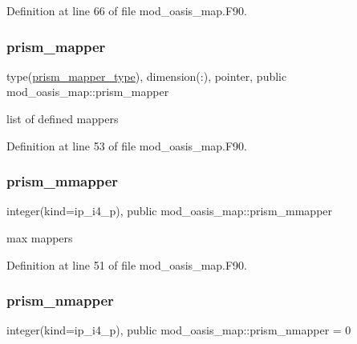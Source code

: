 Definition at line 66 of file mod\+\_\+oasis\+\_\+map.\+F90.

\mbox{\label{namespacemod__oasis__map_a00ad53f61b6998938fca792455487f7e}} 
\subsubsection{\texorpdfstring{prism\+\_\+mapper}{prism\_mapper}}
{\footnotesize\ttfamily type(\hyperlink{structmod__oasis__map_1_1prism__mapper__type}{prism\+\_\+mapper\+\_\+type}), dimension(\+:), pointer, public mod\+\_\+oasis\+\_\+map\+::prism\+\_\+mapper}



list of defined mappers 



Definition at line 53 of file mod\+\_\+oasis\+\_\+map.\+F90.

\mbox{\label{namespacemod__oasis__map_ab15f72e9f33a67181edc977c06b951e2}} 
\subsubsection{\texorpdfstring{prism\+\_\+mmapper}{prism\_mmapper}}
{\footnotesize\ttfamily integer(kind=ip\+\_\+i4\+\_\+p), public mod\+\_\+oasis\+\_\+map\+::prism\+\_\+mmapper}



max mappers 



Definition at line 51 of file mod\+\_\+oasis\+\_\+map.\+F90.

\mbox{\label{namespacemod__oasis__map_af543b83ec5bed63a4448ff641137b0c5}} 
\subsubsection{\texorpdfstring{prism\+\_\+nmapper}{prism\_nmapper}}
{\footnotesize\ttfamily integer(kind=ip\+\_\+i4\+\_\+p), public mod\+\_\+oasis\+\_\+map\+::prism\+\_\+nmapper = 0}



